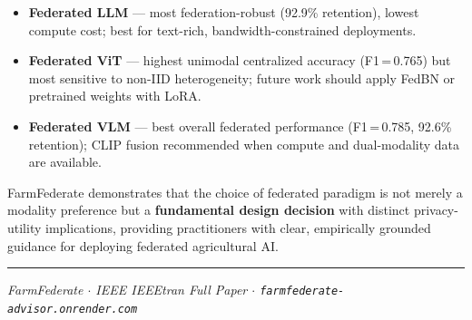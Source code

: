 \documentclass[11pt,a4paper]{article}
\begin{document}
\begin{itemize}[leftmargin=1.5em, itemsep=4pt]
  \item \textbf{\textcolor{llmblue}{Federated LLM}} --- most federation-robust (92.9\% retention),
        lowest compute cost; best for text-rich, bandwidth-constrained deployments.
  \item \textbf{\textcolor{vitgreen}{Federated ViT}} --- highest unimodal centralized accuracy
        (F1\,=\,0.765) but most sensitive to non-IID heterogeneity; future work should apply
        FedBN or pretrained weights with LoRA.
  \item \textbf{\textcolor{vlmred}{Federated VLM}} --- best overall federated performance
        (F1\,=\,0.785, 92.6\% retention); CLIP fusion recommended when compute and
        dual-modality data are available.
\end{itemize}

\noindent FarmFederate demonstrates that the choice of federated paradigm is not merely
a modality preference but a \textbf{fundamental design decision} with distinct
privacy-utility implications, providing practitioners with clear, empirically grounded
guidance for deploying federated agricultural AI.

\vspace{0.5cm}
\noindent\textcolor{greenmid}{\rule{\linewidth}{1pt}}
\begin{center}
  \small\textit{FarmFederate $\cdot$ IEEE IEEEtran Full Paper $\cdot$
  \texttt{farmfederate-advisor.onrender.com}}
\end{center}
\end{document}
